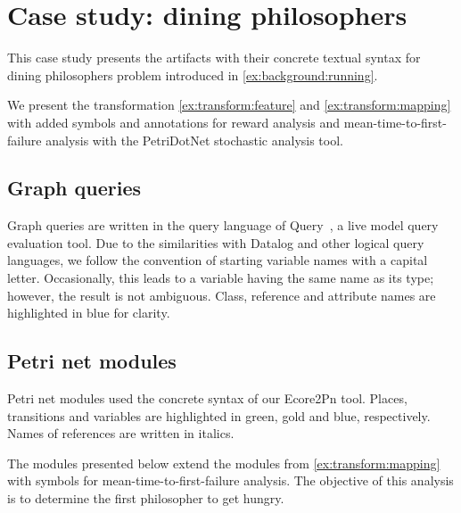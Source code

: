\chapter{Case study: dining philosophers}
\label{app:phils}

This case study presents the artifacts with their concrete textual syntax for
dining philosophers problem introduced in \vref{ex:background:running}.

We present the transformation \vref{ex:transform:feature} and \vref{ex:transform:mapping} with added symbols and annotations for reward analysis and mean-time-to-first-failure analysis with the PetriDotNet stochastic analysis tool.

\section{Graph queries}

Graph queries are written in the query language of  Query~\citep{Ujhelyi15incquery}, a live model query evaluation tool. Due to the similarities with Datalog and other logical query languages, we follow the convention of starting variable names with a capital letter. Occasionally, this leads to a variable having the same name as its type; however, the result is not ambiguous. Class, reference and attribute names are highlighted in blue for clarity.



\section{Petri net modules}

Petri net modules used the concrete syntax of our Ecore2Pn tool. Places, transitions and variables are highlighted in green, gold and blue, respectively. Names of references are written in italics.

The  modules presented below extend the modules from \vref{ex:transform:mapping} with symbols for mean-time-to-first-failure analysis. The objective of this analysis is to determine the first philosopher to get hungry.





